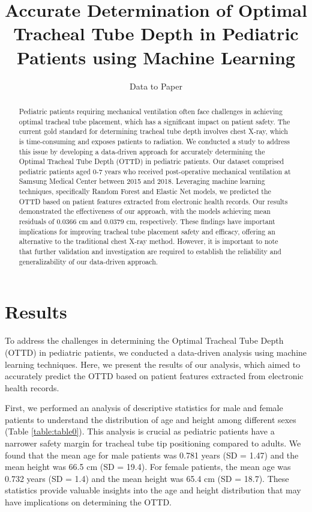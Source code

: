\documentclass[11pt]{article}
\title{Accurate Determination of Optimal Tracheal Tube Depth in Pediatric Patients using Machine Learning}
\author{Data to Paper}
\begin{document}
\maketitle
\begin{abstract}
Pediatric patients requiring mechanical ventilation often face challenges in achieving optimal tracheal tube placement, which has a significant impact on patient safety. The current gold standard for determining tracheal tube depth involves chest X-ray, which is time-consuming and exposes patients to radiation. We conducted a study to address this issue by developing a data-driven approach for accurately determining the Optimal Tracheal Tube Depth (OTTD) in pediatric patients. Our dataset comprised pediatric patients aged 0-7 years who received post-operative mechanical ventilation at Samsung Medical Center between 2015 and 2018. Leveraging machine learning techniques, specifically Random Forest and Elastic Net models, we predicted the OTTD based on patient features extracted from electronic health records. Our results demonstrated the effectiveness of our approach, with the models achieving mean residuals of 0.0366 cm and 0.0379 cm, respectively. These findings have important implications for improving tracheal tube placement safety and efficacy, offering an alternative to the traditional chest X-ray method. However, it is important to note that further validation and investigation are required to establish the reliability and generalizability of our data-driven approach. 
\end{abstract}
\section*{Results}

To address the challenges in determining the Optimal Tracheal Tube Depth (OTTD) in pediatric patients, we conducted a data-driven analysis using machine learning techniques. Here, we present the results of our analysis, which aimed to accurately predict the OTTD based on patient features extracted from electronic health records.

First, we performed an analysis of descriptive statistics for male and female patients to understand the distribution of age and height among different sexes (Table \ref{table:table0}). This analysis is crucial as pediatric patients have a narrower safety margin for tracheal tube tip positioning compared to adults. We found that the mean age for male patients was 0.781 years (SD = 1.47) and the mean height was 66.5 cm (SD = 19.4). For female patients, the mean age was 0.732 years (SD = 1.4) and the mean height was 65.4 cm (SD = 18.7). These statistics provide valuable insights into the age and height distribution that may have implications on determining the OTTD.
\end{document}
